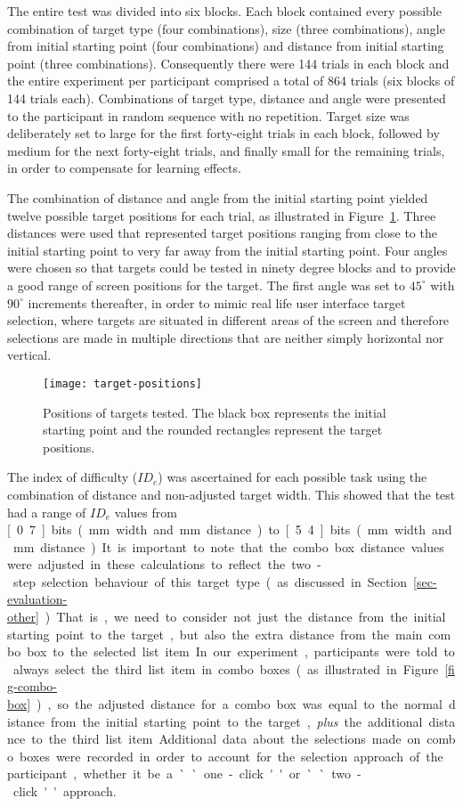 \documentclass[a4paper]{article}
\begin{document}
The entire test was divided into six blocks. Each block contained every
possible combination of target type (four combinations), size (three
combinations), angle from initial starting point (four combinations) and
distance from initial starting point (three combinations). Consequently
there were 144 trials in each block and the entire experiment per
participant comprised a total of 864 trials (six blocks of 144 trials
each). Combinations of target type, distance and angle were presented to
the participant in random sequence with no repetition. Target size was
deliberately set to large for the first forty-eight trials in each block,
followed by medium for the next forty-eight trials, and finally small for
the remaining trials, in order to compensate for learning effects.

The combination of distance and angle from the initial starting point
yielded twelve possible target positions for each trial, as illustrated
in Figure~\ref{fig-target-positions}. Three distances were used that
represented target positions ranging from close to the initial starting
point to very far away from the initial starting point. Four angles were
chosen so that targets could be tested in ninety degree blocks and to
provide a good range of screen positions for the target. The first angle
was set to \(45^{\circ}\) with \(90^{\circ}\) increments thereafter, in
order to mimic real life user interface target selection, where targets
are situated in different areas of the screen and therefore selections
are made in multiple directions that are neither simply horizontal nor
vertical.


\begin{figure}
	\centering
	\texttt{[image: target-positions]}
	\caption{Positions of targets tested. The black box represents the
	initial starting point and the rounded rectangles represent the
	target positions.}
	\label{fig-target-positions}
\end{figure}


The index of difficulty (\(\mathit{ID}_{e}\)) was ascertained for each
possible task using the combination of distance and non-adjusted target
width. This showed that the test had a range of \(\mathit{ID}_{e}\)
values from \unit[0.7]{bits} (\unit[63]{mm} width and \unit[160]{mm}
distance) to \unit[5.4]{bits} (\unit[4]{mm} width and \unit[40]{mm}
distance). It is important to note that the combo box distance values
were adjusted in these calculations to reflect the two-step selection
behaviour of this target type (as discussed in
Section~\ref{sec-evaluation-other}). That is, we need to consider not
just the distance from the initial starting point to the target, but
also the extra distance from the main combo box to the selected list
item. In our experiment, participants were told to always select the
third list item in combo boxes (as illustrated in
Figure~\ref{fig-combo-box}), so the adjusted distance for a combo box
was equal to the normal distance from the initial starting point to the
target, \emph{plus} the additional distance to the third list item.
Additional data about the selections made on combo boxes were recorded
in order to account for the selection approach of the participant,
whether it be a ``one-click'' or ``two-click'' approach.
\end{document}
